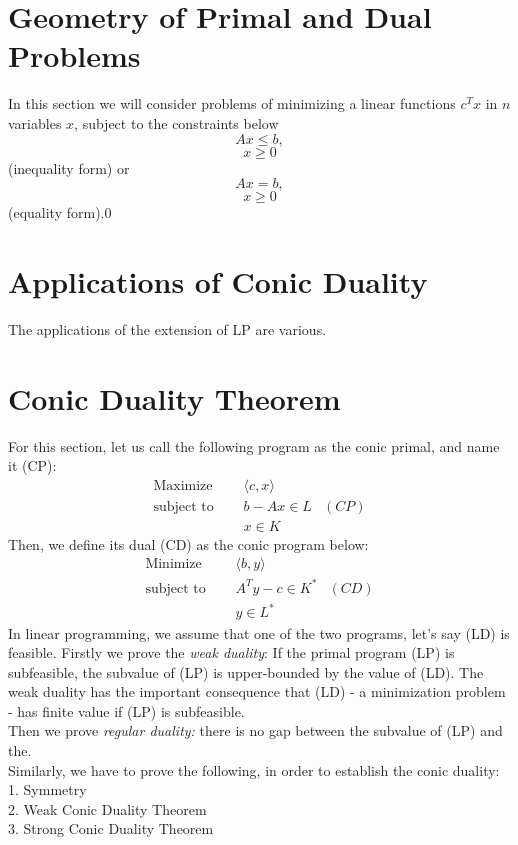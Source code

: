 \documentclass[12pt]{article}
\begin{document}
    \section{Geometry of Primal and Dual Problems}
    In this section we will consider problems of minimizing a linear functions $c^Tx$ in $n$ variables $x$, subject to the constraints below
    $$Ax \leq b,$$ $$x \geq 0$$
    (inequality form) or
    $$Ax = b, $$ $$ x \geq 0$$
    (equality form).0
    \section{Applications of Conic Duality }
    \par The applications of the extension of LP are various. 
    
    \section{Conic Duality Theorem}
    For this section, let us call the following program as the conic primal, and name it (CP):
    \begin{align*}
    		     \text{Maximize } \quad  &\langle c,x \rangle \\
     		 \text{subject to } \quad  &b - Ax \in L &(CP)\\
 											  &x \in K   			
   	\end{align*}
   	Then, we define its dual (CD) as the conic program below:
   	 \begin{align*}
    		     \text{Minimize } \quad  &\langle b,y \rangle \\
     		 \text{subject to } \quad  &A^Ty - c \in K^* &(CD)\\
 											  &y \in L^*   			
   	\end{align*}
   	In linear programming, we assume that one of the two programs, let's say (LD) is feasible. Firstly we prove the \textit{weak duality}: If the primal program (LP) is subfeasible, the subvalue of (LP) is upper-bounded by the value of (LD). The weak duality has the important consequence that (LD) - a minimization problem - has finite value if (LP) is subfeasible. \\
   	Then we prove \textit{regular duality:} there is no gap between the subvalue of (LP) and the. \\
   	Similarly, we have to prove the following, in order to establish the conic duality: \\
   	1. Symmetry \\ 
	2. Weak Conic Duality Theorem \\
	3. Strong Conic Duality Theorem \\
\end{document}
